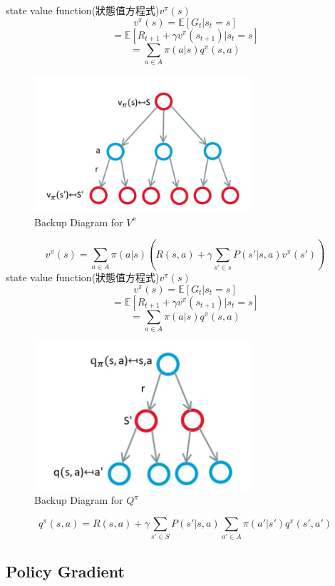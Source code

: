 \documentclass[14pt,a4paper]{report}  %
\begin{document}
state value function(狀態值方程式)$v^{\pi}(s)$\\
$$v^{\pi}(s) = \mathbb{E}[G_t|s_t=s]$$
$$= \mathbb{E}[R_{t+1}+\gamma v^{\pi}(s_{t+1})|s_t=s]$$
$$= \sum_{a\in A}\pi (a|s)q^{\pi}(s, a)$$
\begin{figure}[hbt!]
\begin{center}
\includegraphics[width=8cm]{s_to _s}
\caption{Backup Diagram for $V^{\pi}$}
\label{fig.s_to_s}
\end{center}
\end{figure}
$$v^{\pi}(s) = \sum_{a\in A}\pi (a|s)(R(s, a)+\gamma \sum_{s'\in s}P(s'|s, a)v^{\pi}(s'))$$
state value function(狀態值方程式)$v^{\pi}(s)$
$$v^{\pi}(s) = \mathbb{E}[G_t|s_t=s]$$
$$= \mathbb{E}[R_{t+1}+\gamma v^{\pi}(s_{t+1})|s_t=s]$$
$$= \sum_{a\in A}\pi (a|s)q^{\pi}(s, a)$$
\begin{figure}[hbt!]
\begin{center}
\includegraphics[width=8cm]{Q_pi function}
\caption{Backup Diagram for $Q^{\pi}$}
\label{fig.s_to_s}
\end{center}
\end{figure}
$$q^\pi(s, a)=R(s, a)+\gamma\sum_{s'\in S}P(s'|s, a)\sum_{a'\in A}\pi(a'|s')q^{\pi}(s', a')$$
\subsection{Policy Gradient}
\newpage
\end{document}
